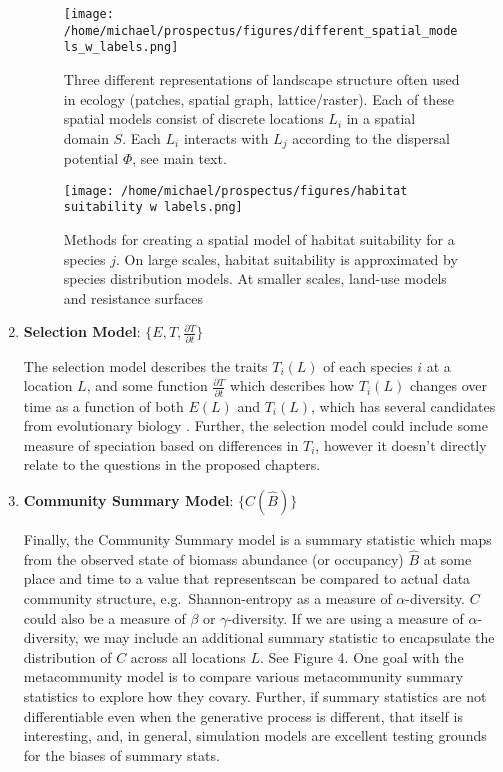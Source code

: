 \documentclass[]{article}
\begin{document}
\begin{enumerate}
  \begin{figure}[H]
  \centering
  \texttt{[image: /home/michael/prospectus/figures/different\_spatial\_models\_w\_labels.png]}
  \caption{Three different representations of landscape structure often used in ecology (patches, spatial graph, lattice/raster). Each of these spatial models consist of discrete locations $L_i$ in a spatial domain $S$. Each $L_i$ interacts with $L_j$ according to the dispersal potential $\Phi$, see main text.}
  \end{figure}

  \begin{figure}[H]
  \centering
  \texttt{[image: /home/michael/prospectus/figures/habitat suitability w labels.png]}
  \caption{Methods for creating a spatial model of habitat suitability for a species $j$. On large scales, habitat suitability is approximated by species distribution models. At smaller scales, land-use models and resistance surfaces }
  \end{figure}
\item
  \textbf{Selection Model}: \(\{ E, T, \frac{\partial T}{\partial t}\}\)

  The selection model describes the traits \(T_i(L)\) of each species
  \(i\) at a location \(L\), and some function
  \(\frac{\partial T}{\partial t}\) which describes how \(T_i(L)\)
  changes over time as a function of both \(E(L)\) and \(T_i(L)\), which
  has several candidates from evolutionary biology
  \citep{price_selection_1970, queller_fundamental_2017}. Further, the selection model could include some
  measure of speciation based on differences in \(T_i\), however it
  doesn't directly relate to the questions in the proposed chapters.
\item
  \textbf{Community Summary Model}: \(\{ C(\hat{B}) \}\)

  Finally, the Community Summary model is a summary statistic which maps
  from the observed state of biomass abundance (or occupancy)
  \(\hat{B}\) at some place and time to a value that representscan be compared to actual data
  community structure, e.g.~Shannon-entropy as a measure of
  \(\alpha\)-diversity. \(C\) could also be a measure of \(\beta\) or
  \(\gamma\)-diversity. If we are using a measure of
  \(\alpha\)-diversity, we may include an additional summary statistic
  to encapsulate the distribution of \(C\) across all locations \(L\).
  See Figure 4. One goal with the metacommunity model is to compare
  various metacommunity summary statistics to explore how they covary.
  Further, if summary statistics are not differentiable even when the
  generative process is different, that itself is interesting, and, in
  general, simulation models are excellent testing grounds for the
  biases of summary stats.
\end{enumerate}
\end{document}
